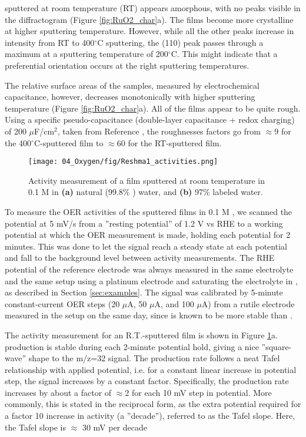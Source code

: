  sputtered at room temperature (RT) appears amorphous, with no peaks visible in the diffractogram (Figure \ref{fig:RuO2_char}a). The films become more crystalline at higher sputtering temperature. However, while all the other peaks increase in intensity from RT to 400$^\circ$C sputtering, the (110) peak passes through a maximum at a sputtering temperature of 200$^\circ$C. This might indicate that a preferential orientation occurs at the right sputtering temperatures.

The relative surface areas of the samples, measured by electrochemical capacitance, however, decreases monotonically with higher sputtering temperature (Figure \ref{fig:RuO2_char}a). All of the films appear to be quite rough. Using a specific pseudo-capacitance (double-layer capacitance + redox charging) of 200 $\mu$F/cm$^2$, taken from Reference \cite{Yoshida2013}, the roughnesses factors go from $\approx$9 for the 400$^\circ$C-sputtered film to $\approx$60 for the RT-sputtered film. %

\begin{figure}[h!]
	\texttt{[image: 04\_Oxygen/fig/Reshma1\_activities.png]}
	\caption{Activity measurement of a  film sputtered at room temperature in 0.1 M  in \textbf{(a)} natural (99.8\% ) water, and \textbf{(b)} 97\%  labeled water.}
	\label{fig:Reshma1_activities}
\end{figure}


To measure the OER activities of the sputtered films in 0.1 M , we scanned the potential at 5 mV/s from a ''resting potential'' of 1.2 V vs RHE to a working potential at which the OER measurement is made, holding each potential for 2 minutes. This was done to let the  signal reach a steady state at each potential and fall to the background level between activity measurements. The RHE potential of the reference electrode was always measured in the same electrolyte and the same setup using a platinum electrode and saturating the electrolyte in , as described in Section \ref{sec:examples}. The  signal was calibrated by 5-minute constant-current OER steps (20 $\mu$A, 50 $\mu$A, and 100 $\mu$A) from a rutile  electrode measured in the setup on the same day, since  is known to be more stable than \cite{Reier2017}.

The activity measurement for an R.T.-sputtered film is shown in Figure \ref{fig:Reshma1_activities}a.  production is stable during each 2-minute potential hold, giving a nice ''square-wave'' shape to the m/z=32 signal. The  production rate follows a neat Tafel relationship with applied potential, i.e. for a constant linear increase in potential step, the  signal increases by a constant factor. Specifically, the  production rate increases by about a factor of $\approx$2 for each 10 mV step in potential. More commonly, this is stated in the reciprocal form, as the extra potential required for a factor 10 increase in activity (a ''decade''), referred to as the Tafel slope. Here, the Tafel slope is $\approx$ 30 mV per decade

